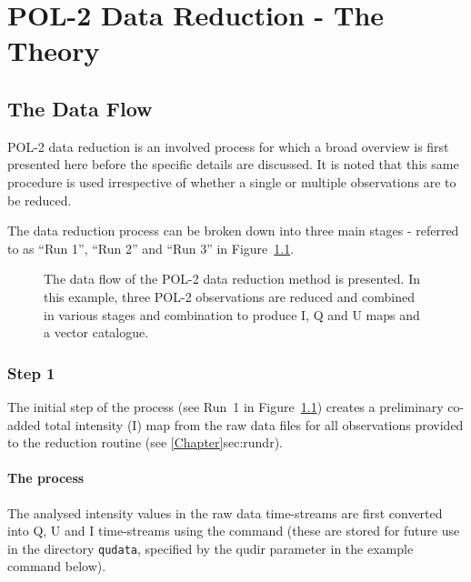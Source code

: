 \chapter{POL-2 Data Reduction - The Theory}
\label{sec:dr}
\section{The Data Flow}

POL-2 data reduction is an involved process for which a broad overview
is first presented here before the specific details are discussed. It
is noted that this same procedure is used irrespective of whether a
single or multiple observations are to be reduced.

The data reduction process can be broken down into three main stages -
referred to as ``Run 1'', ``Run 2'' and ``Run 3'' in Figure~\ref{fig:pol2drflow}.

\begin{figure}[t!]
\begin{center}
\caption [POL-2 Data Flow]{ The data flow of the POL-2 data reduction
  method is presented. In this example, three POL-2 observations are
  reduced and combined in various stages and combination to produce I,
  Q and U maps and a vector catalogue.  }
\label{fig:pol2drflow}
\end{center}
\end{figure}


\subsection*{Step 1}

The initial step of the process (see Run~1 in Figure~\ref{fig:pol2drflow})
creates a preliminary co-added total intensity
(I) map from the raw data files for all observations provided to the
reduction routine (see \cref{Chapter}{sec:rundr}{}).


\subsubsection*{The process}
The analysed intensity values in the raw data time-streams are first
converted into Q, U and I time-streams using the
 command (these are stored
for future use in the directory \texttt{qudata}, specified by the
qudir parameter in the example command below).

